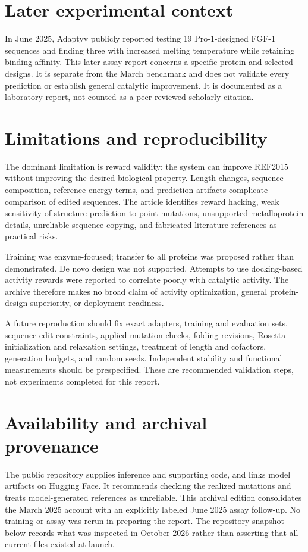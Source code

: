 \documentclass[10pt,a4paper]{article}
\begin{document}
\section{Later experimental context}
In June 2025, Adaptyv publicly reported testing 19 Pro-1-designed FGF-1 sequences and finding three with increased melting temperature while retaining binding affinity. This later assay report concerns a specific protein and selected designs. It is separate from the March benchmark and does not validate every prediction or establish general catalytic improvement. It is documented as a laboratory report, not counted as a peer-reviewed scholarly citation. \cite{ref4}

\section{Limitations and reproducibility}
The dominant limitation is reward validity: the system can improve REF2015 without improving the desired biological property. Length changes, sequence composition, reference-energy terms, and prediction artifacts complicate comparison of edited sequences. The article identifies reward hacking, weak sensitivity of structure prediction to point mutations, unsupported metalloprotein details, unreliable sequence copying, and fabricated literature references as practical risks. \cite{ref1}

Training was enzyme-focused; transfer to all proteins was proposed rather than demonstrated. De novo design was not supported. Attempts to use docking-based activity rewards were reported to correlate poorly with catalytic activity. The archive therefore makes no broad claim of activity optimization, general protein-design superiority, or deployment readiness. \cite{ref1,ref2}

A future reproduction should fix exact adapters, training and evaluation sets, sequence-edit constraints, applied-mutation checks, folding revisions, Rosetta initialization and relaxation settings, treatment of length and cofactors, generation budgets, and random seeds. Independent stability and functional measurements should be prespecified. These are recommended validation steps, not experiments completed for this report.

\section{Availability and archival provenance}
The public repository supplies inference and supporting code, and links model artifacts on Hugging Face. It recommends checking the realized mutations and treats model-generated references as unreliable. This archival edition consolidates the March 2025 account with an explicitly labeled June 2025 assay follow-up. No training or assay was rerun in preparing the report. The repository snapshot below records what was inspected in October 2026 rather than asserting that all current files existed at launch. \cite{ref1,ref2,ref3}
\end{document}
